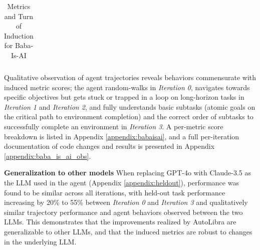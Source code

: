 \begin{table}
\begin{tabular}{ccl}
		\bottomrule
	\end{tabular}
	\caption{Metrics and Turn of Induction
	\newline
	for Baba-Is-AI}
	\label{tab:baba_is_ai_metrics}
\end{table}


Qualitative observation of agent trajectories reveals behaviors commensurate with
induced metric scores; the agent random-walks in \textit{Iteration 0}, navigates
towards specific objectives but gets stuck or trapped in a loop on long-horizon
tasks in \textit{Iteration 1} and \textit{Iteration 2}, and fully understands basic
subtasks (atomic goals on the critical path to environment completion) and the correct
order of subtasks to successfully complete an environment in \textit{Iteration 3}.
A per-metric score breakdown is listed in Appendix \ref{appendix:babaisai}, and
a full per-iteration documentation of code changes and results is presented in
Appendix \ref{appendix:baba_is_ai_obs}.




\textbf{Generalization to other models} When replacing GPT-4o with Claude-3.5 as
the LLM used in the agent (Appendix \ref{appendix:heldout}), performance was found
to be similar across all iterations, with held-out task performance increasing
by 20\% to 55\% between \textit{Iteration 0} and \textit{Iteration 3} and
qualitatively similar trajectory performance and agent behaviors observed
between the two LLMs. This demonstrates that the improvements realized by AutoLibra
are generalizable to other LLMs, and that the induced metrics are robust to
changes in the underlying LLM.

